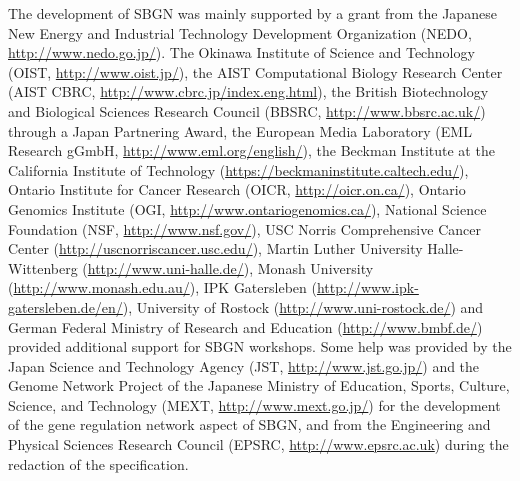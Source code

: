 The development of SBGN was mainly supported by a grant from the Japanese New Energy and Industrial Technology Development Organization (NEDO, \url{http://www.nedo.go.jp/}). 
The Okinawa Institute of Science and Technology (OIST, \url{http://www.oist.jp/}), 
the AIST Computational Biology Research Center (AIST CBRC, \url{http://www.cbrc.jp/index.eng.html}), 
the British Biotechnology and Biological Sciences Research Council (BBSRC, \url{http://www.bbsrc.ac.uk/}) through a Japan Partnering Award, 
the European Media Laboratory (EML Research gGmbH, \url{http://www.eml.org/english/}), 
the Beckman Institute at the California Institute of Technology (\url{https://beckmaninstitute.caltech.edu/}), 
Ontario Institute for Cancer Research (OICR, \url{http://oicr.on.ca/}), 
Ontario Genomics Institute (OGI, \url{http://www.ontariogenomics.ca/}), 
National Science Foundation (NSF, \url{http://www.nsf.gov/}), 
USC Norris Comprehensive Cancer Center (\url{http://uscnorriscancer.usc.edu/}), 
Martin Luther University Halle-Wittenberg (\url{http://www.uni-halle.de/}), 
Monash University (\url{http://www.monash.edu.au/}), 
IPK Gatersleben (\url{http://www.ipk-gatersleben.de/en/}), 
University of Rostock (\url{http://www.uni-rostock.de/})  and 
German Federal Ministry of Research and Education (\url{http://www.bmbf.de/}) provided additional support for SBGN workshops. 
Some help was provided by the Japan Science and Technology Agency (JST, \url{http://www.jst.go.jp/}) and the Genome Network Project of the Japanese Ministry of Education, Sports, Culture, Science, and Technology (MEXT, \url{http://www.mext.go.jp/}) for the development of the gene regulation network aspect of SBGN, and from the Engineering and Physical Sciences Research Council (EPSRC, \url{http://www.epsrc.ac.uk}) during the redaction of the specification.

